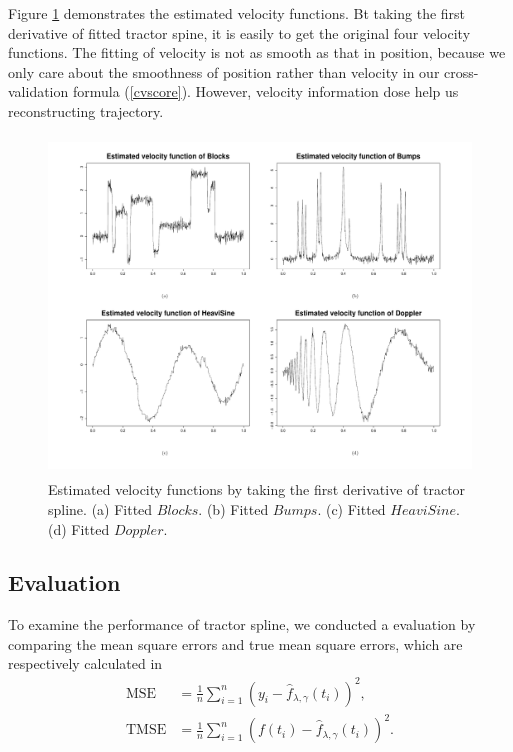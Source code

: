 Figure \ref{numvtractor} demonstrates the estimated velocity functions. Bt taking the first derivative of fitted tractor spine, it is easily to get the original four velocity functions. The fitting of velocity is not as smooth as that in position, because we only care about the smoothness of position rather than velocity in our cross-validation formula (\ref{cvscore}). However, velocity information dose help us reconstructing trajectory.

\begin{figure}
\centering
         \includegraphics[width=\textwidth,height=9cm]{Chapters/2.TractorSplineTheory/plot/vtractor04} 
     \caption{Estimated velocity functions by taking the first derivative of tractor spline. (a) Fitted $\mathit{Blocks}$. (b) Fitted $\mathit{Bumps}$. (c) Fitted $\mathit{HeaviSine}$. (d) Fitted $\mathit{Doppler}$.}\label{numvtractor}
\end{figure}


\subsection{Evaluation}
To examine the performance of tractor spline, we conducted a evaluation by comparing the mean square errors and true mean square errors, which are respectively calculated in
\begin{align}
\mbox{MSE}&= \frac{1}{n} \sum_{i=1}^{n} (y_i-\hat{f}_{\lambda,\gamma}(t_i))^2,\\
\mbox{TMSE}&= \frac{1}{n} \sum_{i=1}^{n} (f(t_i)-\hat{f}_{\lambda,\gamma}(t_i))^2.
\end{align}

